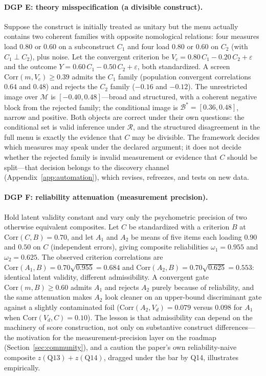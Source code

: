\documentclass[10pt,letterpaper]{article}
\newcommand{\M}{\ensuremath{\mathcal{M}}}
\newcommand{\Rset}{\mathcal{R}}
\newcommand{\Bset}{\mathcal{B}}
\begin{document}
\paragraph{DGP E: theory misspecification (a divisible construct).}
Suppose the construct is initially treated as unitary but the menu actually contains two coherent families with opposite nomological relations: four measures load $0.80$ or $0.60$ on a subconstruct $C_1$ and four load $0.80$ or $0.60$ on $C_2$ (with $C_1\perp C_2$), plus noise.
Let the convergent criterion be $V_c=0.80\,C_1-0.20\,C_2+\varepsilon$ and the outcome $Y=0.60\,C_1-0.50\,C_2+\varepsilon$, both standardized.
A screen $\mathrm{Corr}(m,V_c)\ge 0.39$ admits the $C_1$ family (population convergent correlations $0.64$ and $0.48$) and rejects the $C_2$ family ($-0.16$ and $-0.12$).
The unrestricted image over $\M$ is $[-0.40,0.48]$---broad and structured, with a coherent negative block from the rejected family; the conditional image is $\Bset^*=[0.36,0.48]$, narrow and positive.
Both objects are correct under their own questions: the conditional set is valid inference under $\Rset$, and the structured disagreement in the full menu is exactly the evidence that $C$ may be divisible.
The framework decides which measures may speak under the declared argument; it does not decide whether the rejected family is invalid measurement or evidence that $C$ should be split---that decision belongs to the discovery channel (Appendix~\ref{app:automation}), which revises, refreezes, and tests on new data.

\paragraph{DGP F: reliability attenuation (measurement precision).}
Hold latent validity constant and vary only the psychometric precision of two otherwise equivalent composites.
Let $C$ be standardized with a criterion $B$ at $\mathrm{Corr}(C,B)=0.70$, and let $A_1$ and $A_2$ be means of five items each loading $0.90$ and $0.50$ on $C$ (independent errors), giving composite reliabilities $\omega_1=0.955$ and $\omega_2=0.625$.
The observed criterion correlations are $\mathrm{Corr}(A_1,B)=0.70\sqrt{0.955}=0.684$ and $\mathrm{Corr}(A_2,B)=0.70\sqrt{0.625}=0.553$: identical latent validity, different admissibility.
A convergent gate $\mathrm{Corr}(m,B)\ge 0.60$ admits $A_1$ and rejects $A_2$ purely because of reliability, and the same attenuation makes $A_2$ look cleaner on an upper-bound discriminant gate against a slightly contaminated foil ($\mathrm{Corr}(A_2,V_d)=0.079$ versus $0.098$ for $A_1$ when $\mathrm{Corr}(V_d,C)=0.10$).
The lesson is that admissibility can depend on the machinery of score construction, not only on substantive construct differences---the motivation for the measurement-precision layer on the roadmap (Section~\ref{sec:community}), and a caution the paper's own reliability-naive composite $z(\mathrm{Q13})+z(\mathrm{Q14})$, dragged under the bar by Q14, illustrates empirically.
\end{document}
